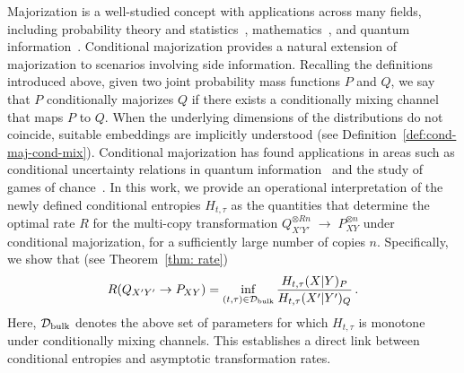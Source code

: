 \documentclass[aps,pra,11pt,onecolumn,nofootinbib,tightenlines]{revtex4-2}
\theoremstyle{definition}
\newcommand{\D}{\mathcal{D}}
\begin{document}
Majorization is a well-studied concept with applications across many fields, including probability theory and statistics~\cite{marshall1979inequalities}, mathematics~\cite{bhatia1997matrix}, and quantum information~\cite{nielsen1999conditions,horodecki2013fundamental}. Conditional majorization provides a natural extension of majorization to scenarios involving side information. Recalling the definitions introduced above, given two joint probability mass functions $P$ and $Q$, we say that $P$ conditionally majorizes $Q$ if there exists a conditionally mixing channel that maps $P$ to $Q$. When the underlying dimensions of the distributions do not coincide, suitable embeddings are implicitly understood (see Definition~\ref{def:cond-maj-cond-mix}).
Conditional majorization has found applications in areas such as conditional uncertainty relations in quantum information~\cite{gour2018conditional} and the study of games of chance~\cite{brandsen2022entropy}.
In this work, we provide an operational interpretation of the newly defined conditional entropies $H_{t,\tau}$ as the quantities that determine the optimal rate $R$ for the multi-copy transformation $Q_{X'Y'}^{\otimes R n} \;\longrightarrow\;P_{XY}^{\otimes n}$
under conditional majorization, for a sufficiently large number of copies $n$. Specifically, we show that (see Theorem~\ref{thm: rate})
\begin{equation}
R(Q_{X'Y'} \rightarrow  P_{XY}) = \inf_{(t,\tau) \in \D_{\rm{bulk}}} \frac{H_{t,\tau}(X|Y)_P }{H_{t,\tau}(X'|Y')_Q} \,.
\end{equation}
Here, \(\D_{\rm{bulk}}\) denotes the above set of parameters for which \(H_{t,\tau}\) is monotone under conditionally mixing channels.
This establishes a direct link between conditional entropies and asymptotic transformation rates.

\medskip
\end{document}
